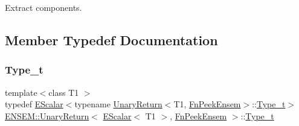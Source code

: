 Extract components. 

\subsection{Member Typedef Documentation}
\mbox{\label{structENSEM_1_1UnaryReturn_3_01EScalar_3_01T1_01_4_00_01FnPeekEnsem_01_4_a6043117f7e0aff65d845b3da0fb24d01}} 
\subsubsection{\texorpdfstring{Type\_t}{Type\_t}\hspace{0.1cm}{\footnotesize\ttfamily [1/2]}}
{\footnotesize\ttfamily template$<$class T1 $>$ \\
typedef \mbox{\hyperlink{classENSEM_1_1EScalar}{E\+Scalar}}$<$typename \mbox{\hyperlink{structENSEM_1_1UnaryReturn}{Unary\+Return}}$<$T1, \mbox{\hyperlink{structENSEM_1_1FnPeekEnsem}{Fn\+Peek\+Ensem}}$>$\+::\mbox{\hyperlink{structENSEM_1_1UnaryReturn_3_01EScalar_3_01T1_01_4_00_01FnPeekEnsem_01_4_a6043117f7e0aff65d845b3da0fb24d01}{Type\+\_\+t}}$>$ \mbox{\hyperlink{structENSEM_1_1UnaryReturn}{E\+N\+S\+E\+M\+::\+Unary\+Return}}$<$ \mbox{\hyperlink{classENSEM_1_1EScalar}{E\+Scalar}}$<$ T1 $>$, \mbox{\hyperlink{structENSEM_1_1FnPeekEnsem}{Fn\+Peek\+Ensem}} $>$\+::\mbox{\hyperlink{structENSEM_1_1UnaryReturn_3_01EScalar_3_01T1_01_4_00_01FnPeekEnsem_01_4_a6043117f7e0aff65d845b3da0fb24d01}{Type\+\_\+t}}}

\mbox{\label{structENSEM_1_1UnaryReturn_3_01EScalar_3_01T1_01_4_00_01FnPeekEnsem_01_4_a6043117f7e0aff65d845b3da0fb24d01}} 

